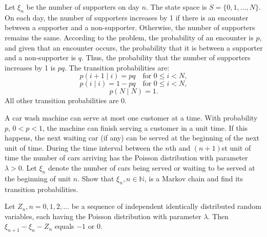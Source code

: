 \begin{Solution}
Let $\xi_n$ be the number of supporters on day $n$. The state space is $S = \{0, 1, \dots, N\}$. On each day, the number of supporters increases by 1 if there is an encounter between a supporter and a non-supporter. Otherwise, the number of supporters remains the same. According to the problem, the probability of an encounter is $p$, and given that an encounter occurs, the probability that it is between a supporter and a non-supporter is $q$. Thus, the probability that the number of supporters increases by 1 is $pq$.
The transition probabilities are:
\[
p(i+1 \mid i) = pq \quad \text{for } 0 \leq i < N,
\]
\[
p(i \mid i) = 1 - pq \quad \text{for } 0 \leq i < N,
\]
\[
p(N \mid N) = 1.
\]
All other transition probabilities are 0.
\end{Solution}

\begin{Exercise}
\label{exr:queuing}
A car wash machine can serve at most one customer at a time. With probability $p$, $0 < p < 1$, the machine can finish serving a customer in a unit time. If this happens, the next waiting car (if any) can be served at the beginning of the next unit of time. During the time interval between the $n$th and $(n+1)$st unit of time the number of cars arriving has the Poisson distribution with parameter $\lambda > 0$. Let $\xi_n$ denote the number of cars being served or waiting to be served at the beginning of unit $n$. Show that $\xi_n, n\in\mathbb{N}$, is a Markov chain and find its transition probabilities.

\begin{hint}
Let $Z_n, n=0,1,2,\ldots$ be a sequence of independent identically distributed random variables, each having the Poisson distribution with parameter $\lambda$. Then $\xi_{n+1} - \xi_n - Z_n$ equals $-1$ or $0$.
\end{hint}
\end{Exercise}

